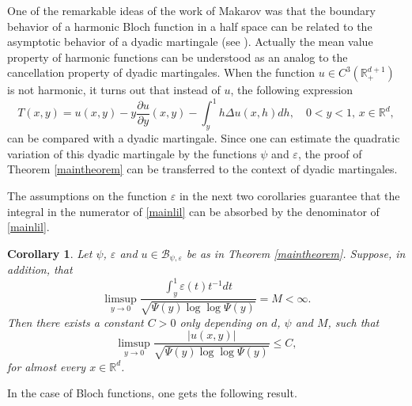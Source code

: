 \documentclass[11pt,letterpaper]{amsart}
\newtheorem{cor}{Corollary}[section]
\theoremstyle{definition}
\numberwithin{equation}{section}
\newcommand{\R}{\mathbb R}
\begin{document}
One of the remarkable ideas of the work of Makarov was that the boundary behavior of a harmonic Bloch function in a half space can be related to the asymptotic behavior of a dyadic martingale (see \cite{M, M2}). Actually the mean value property of harmonic functions can be understood as an analog  to the cancellation property of dyadic martingales. When the function $u \in C^3 (\R^{d+1}_+)$ is not harmonic, it turns out that instead of $u$, the following expression  
$$
T(x,y) = u(x,y) - y \frac{\partial u}{\partial y}(x,y) - \int_y^1 h \Delta u(x,h) dh, \quad 0<y<1, \, x \in \R^d , 
$$
can be compared with a dyadic martingale. Since one can estimate the quadratic variation of this dyadic martingale by the functions $\psi$ and $\varepsilon$, the proof of Theorem \ref{maintheorem} can be transferred to the context of dyadic martingales. 

The assumptions on the function $\varepsilon$ in the next two corollaries guarantee that the integral in the numerator of \eqref{mainlil} can be absorbed by the denominator of \eqref{mainlil}. 

\begin{cor}\label{corlil1}
Let $\psi$, $\varepsilon$ and $u \in \mathcal{B}_{\psi , \varepsilon }$ be as in Theorem \ref{maintheorem}. Suppose, in addition, that
\begin{equation}\label{epsilon1}
\limsup_{y\to 0} \frac{\displaystyle \int_y^1 \varepsilon (t) t^{-1} dt}{\sqrt{\Psi (y) \log \log \Psi (y)}} = M < \infty . 
\end{equation}
Then there exists a constant $C>0$ only depending on $d$, $\psi$ and $M$, such that
$$
\limsup_{y\to 0} \frac{ \displaystyle |u(x,y)| }{\sqrt{\Psi (y) \log \log \Psi (y)} } \leq C , 
$$
for almost every $x\in \R^d$.
\end{cor}

In the case of Bloch functions, one gets the following result.

\end{document}
